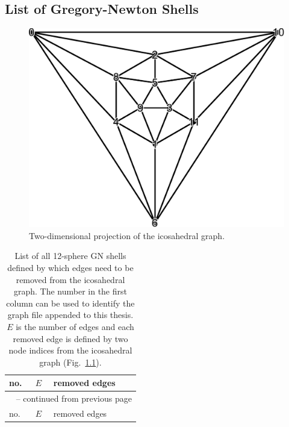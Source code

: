 
\begin{appendix}

\chapter{List of Gregory-Newton Shells}
\label{sec:listofgregorynewtonshells}

    \begin{figure}[h]\centering
\includegraphics[width=\textwidth]{gregory-newton/ico.pdf}
    \caption{Two-dimensional projection of the icosahedral graph.}
    \label{fig:icographappendix}
\end{figure}

\small{\begin{longtable}{lll}
    \caption{List of all 12-sphere \ac{GN} shells defined by which edges need
    to be removed from the icosahedral graph. The number in the first column
    can be used to identify the graph file appended to this thesis. $E$ is the
    number of edges and each removed edge is defined by two node indices from
    the icosahedral graph (Fig.~\ref{fig:icographappendix}).}
    \label{tab:icosubgraphs}\\

\toprule no.  & $E$  &  removed edges \\\midrule\endfirsthead

\multicolumn{3}{c}{\tablename~\thetable{} -- continued from previous page}\\
\toprule no.  & $E$  &  removed edges \\\midrule
\endhead


\end{longtable}}
\end{appendix}
